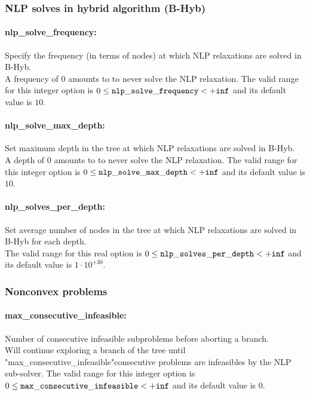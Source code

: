\subsubsection{NLP solves in hybrid algorithm (B-Hyb)}
\label{sec:NLP_solves_in_hybrid_algorithm_(B-Hyb)}

\paragraph{nlp\_solve\_frequency:}\label{sec:nlp_solve_frequency} Specify the frequency (in terms of nodes) at which NLP relaxations are solved in B-Hyb. $\;$ \\
 A frequency of 0 amounts to to never solve the
NLP relaxation. The valid range for this integer option is
$0 \le {\tt nlp\_solve\_frequency } <  {\tt +inf}$
and its default value is $10$.


\paragraph{nlp\_solve\_max\_depth:}\label{sec:nlp_solve_max_depth} Set maximum depth in the tree at which NLP relaxations are solved in B-Hyb. $\;$ \\
 A depth of 0 amounts to to never solve the NLP
relaxation. The valid range for this integer option is
$0 \le {\tt nlp\_solve\_max\_depth } <  {\tt +inf}$
and its default value is $10$.


\paragraph{nlp\_solves\_per\_depth:}\label{sec:nlp_solves_per_depth} Set average number of nodes in the tree at which NLP relaxations are solved in B-Hyb for each depth. $\;$ \\
 The valid range for this real option is 
$0 \le {\tt nlp\_solves\_per\_depth } <  {\tt +inf}$
and its default value is $1 \cdot 10^{+30}$.


\subsubsection{Nonconvex problems}
\label{sec:Nonconvex_problems}

\paragraph{max\_consecutive\_infeasible:}\label{sec:max_consecutive_infeasible} Number of consecutive infeasible subproblems before aborting a branch. $\;$ \\
 Will continue exploring a branch of the tree
until "max\_consecutive\_infeasible"consecutive
problems are infeasibles by the NLP sub-solver. The valid range for this integer option is
$0 \le {\tt max\_consecutive\_infeasible } <  {\tt +inf}$
and its default value is $0$.


